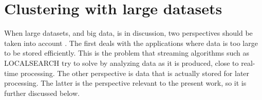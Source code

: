 

%
%

\section{Clustering with large datasets}
\label{sec:big data}







When large datasets, and big data, is in discussion, two perspectives should be taken into account \cite{Aggarwal2014}.
The first deals with the applications where data is too large to be stored efficiently.
This is the problem that streaming algorithms such as LOCALSEARCH \cite{bigdatastream} try to solve by analyzing data as it is produced, close to real-time processing.
The other perspective is data that is actually stored for later processing.
The latter is the perspective relevant to the present work, so it is further discussed below.

